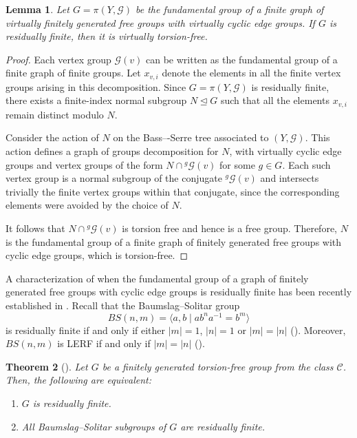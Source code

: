 \documentclass[a4paper]{amsart}
\newtheorem{lem}{Lemma}[section]
\newtheorem{teo}[lem]{Theorem}
\theoremstyle{definition}
\theoremstyle{remark}
\newcommand{\G}{\mathcal G}
\begin{document}
\begin{lem}\label{lem-residually-finite} Let \(G = \pi(Y, \G)\) be the fundamental group of a finite graph of virtually finitely generated free groups with virtually cyclic edge groups. If \(G\) is residually finite, then it is virtually torsion-free.
\end{lem}
\begin{proof} Each vertex group \(\G(v)\) can be written as the fundamental group of a finite graph of finite groups. Let \(x_{v,i}\) denote the elements in all the finite vertex groups arising in this decomposition. Since \(G = \pi(Y, \G)\) is residually finite, there exists a finite-index normal subgroup \(N \unlhd G \) such that all the elements \(x_{v,i}\) remain distinct modulo \(N\).

Consider the action of \(N\) on the Bass–-Serre tree associated to \((Y, \G)\). This action defines a graph of groups decomposition for \(N\), with virtually cyclic edge groups and vertex groups of the form \(N \cap {^g\mathcal{G}(v)}\) for some \(g \in G\). Each such vertex group is a normal subgroup of the conjugate \({^g\mathcal{G}(v)}\) and intersects trivially the finite vertex groups within that conjugate, since the corresponding elements were avoided by the choice of \(N\).

It follows that \(N \cap {^g\mathcal{G}(v)}\) is torsion free and  hence is a free group. Therefore, \(N\) is the fundamental group of a finite graph of finitely generated free groups with cyclic edge groups, which is torsion-free.
\end{proof}

A characterization of when the fundamental group of a graph of finitely generated free groups with cyclic edge groups is residually finite has been recently established in \cite{AM24}. Recall that the Baumslag--Solitar group \[BS(n,m) = \langle a,b \mid ab^na^{-1} = b^m \rangle\] is residually finite if and only if either \(|m| = 1\), \(|n| = 1\) or \(|m| = |n|\) (\cite[Thm. 1]{moldavanskii_residual_2018}). Moreover, \(BS(n,m)\) is LERF if and only if \(|m| = |n|\) (\cite[Sec. 4]{moldavanskii_residual_2018}).

\begin{teo}[{\cite[Thm. A, Prop. 3.6]{AM24}}]\label{res-free} Let \(G\) be a finitely generated torsion-free group from the class \(\mathcal{C}\). Then, the following are equivalent:
\begin{enumerate}
    \item \(G\) is residually finite.
    \item All Baumslag--Solitar subgroups of \(G\) are residually finite.
\end{enumerate}
\end{teo}
\end{document}

